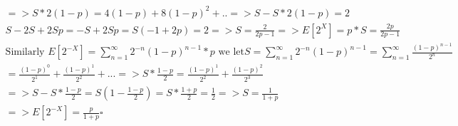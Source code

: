 \documentclass[11pt]{article}
\begin{document}
\begin{enumerate}
\begin{gather}
=>S*2(1-p) = 4(1-p) + 8(1-p)^2 + .. => S-S*2(1-p) = 2\\
S-2S+2Sp = -S+2Sp = S(-1 + 2p) = 2 => S = \frac{2}{2p-1} =>E[2^X]=p*S = \frac{2p}{2p-1} \\
\text{Similarly  }
E[2^{-X}] = \sum_{n=1}^{\infty} 2^{-n} (1-p)^{n-1}*p \text{ we let} S =\sum_{n=1}^{\infty} 2^{-n} (1-p)^{n-1} = \sum_{n=1}^{\infty} \frac{(1-p)^{n-1}}{2^n}\\
= \frac{(1-p)^{0}}{2^1} + \frac{(1-p)^{1}}{2^2} + ... => S*\frac{1-p}{2} = \frac{(1-p)^{1}}{2^2} + \frac{(1-p)^{2}}{2^3} \\
=> S-S*\frac{1-p}{2} = S(1-\frac{1-p}{2}) = S * \frac{1+p}{2} = \frac{1}{2} => S = \frac{1}{1+p}\\
=> E[2^{-X}] = \frac{p}{1+p} \square
\end{gather}
\end{enumerate}
\end{document}
